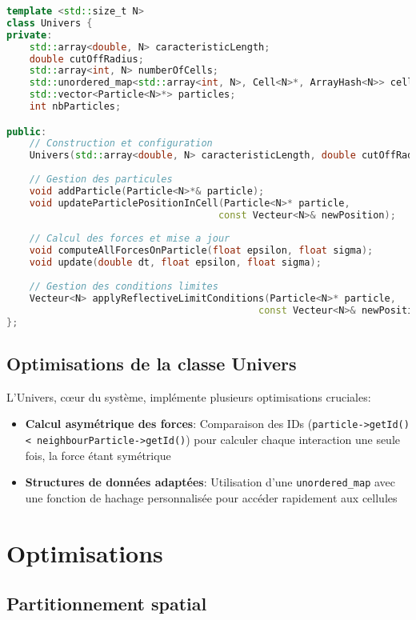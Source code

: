 \documentclass[12pt,a4paper]{article}
\begin{document}
\begin{lstlisting}[language=C++, caption=Extrait de la classe Univers]
template <std::size_t N>
class Univers {
private:
    std::array<double, N> caracteristicLength;
    double cutOffRadius;
    std::array<int, N> numberOfCells;
    std::unordered_map<std::array<int, N>, Cell<N>*, ArrayHash<N>> cells;
    std::vector<Particle<N>*> particles;
    int nbParticles;

public:
    // Construction et configuration
    Univers(std::array<double, N> caracteristicLength, double cutOffRadius);
    
    // Gestion des particules
    void addParticle(Particle<N>*& particle);
    void updateParticlePositionInCell(Particle<N>* particle, 
                                     const Vecteur<N>& newPosition);
    
    // Calcul des forces et mise a jour
    void computeAllForcesOnParticle(float epsilon, float sigma);
    void update(double dt, float epsilon, float sigma);
    
    // Gestion des conditions limites
    Vecteur<N> applyReflectiveLimitConditions(Particle<N>* particle, 
                                            const Vecteur<N>& newPosition);
};
\end{lstlisting}

\subsection{Optimisations de la classe Univers}

L'Univers, cœur du système, implémente plusieurs optimisations cruciales:

\begin{itemize}
    \item \textbf{Calcul asymétrique des forces}: Comparaison des IDs (\texttt{particle->getId() < neighbourParticle->getId()}) pour calculer chaque interaction une seule fois, la force étant symétrique
    \item \textbf{Structures de données adaptées}: Utilisation d'une \texttt{unordered\_map} avec une fonction de hachage personnalisée pour accéder rapidement aux cellules
\end{itemize}

\section{Optimisations}

\subsection{Partitionnement spatial}
\end{document}
